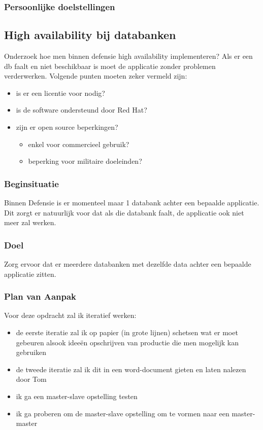 \subsubsection{Persoonlijke doelstellingen}

\subsection{High availability bij databanken}


Onderzoek hoe men binnen defensie high availability implementeren? Als er een db faalt en niet beschikbaar is moet de applicatie zonder problemen verderwerken. Volgende punten moeten zeker vermeld zijn:

\begin{itemize}
    \item is er een licentie voor nodig?
    \item is de software ondersteund door Red Hat?
    \item zijn er open source beperkingen?
    \begin{itemize}
        \item enkel voor commercieel gebruik?
        \item beperking voor militaire doeleinden?
    \end{itemize}
\end{itemize}

\subsubsection{Beginsituatie}

Binnen Defensie is er momenteel maar 1 databank achter een bepaalde applicatie. Dit zorgt er natuurlijk voor dat als die databank faalt, de applicatie ook niet meer zal werken.

\subsubsection{Doel}

Zorg ervoor dat er meerdere databanken met dezelfde data achter een bepaalde applicatie zitten.

\subsubsection{Plan van Aanpak}

Voor deze opdracht zal ik iteratief werken:

\begin{itemize}
    \item de eerste iteratie zal ik op papier (in grote lijnen) schetsen wat er moet gebeuren alsook ideeën opschrijven van productie die men mogelijk kan gebruiken
    \item de tweede iteratie zal ik dit in een word-document gieten en laten nalezen door Tom
    \item ik ga een master-slave opstelling testen
    \item ik ga proberen om de master-slave opstelling om te vormen naar een master-master
\end{itemize}

